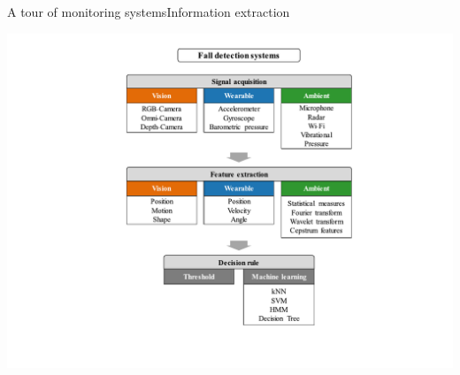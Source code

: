 \documentclass[8pt,t,aspectratio=1610]{beamer}
\begin{document}
\begin{frame}{A tour of monitoring systems}{Information extraction}
\begin{minipage}[t]{0.49\linewidth}
\begin{overprint}
            \includegraphics[width=\linewidth, trim={190 50 150 60}, clip]{fall_systems_3-14.pdf}
        \end{overprint}
    \end{minipage}
\end{frame}
\end{document}
